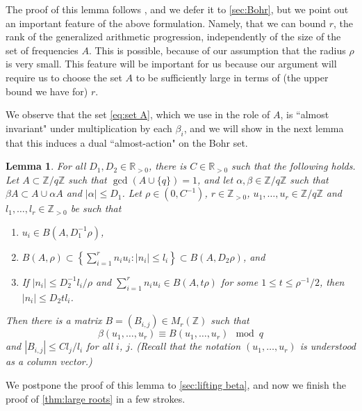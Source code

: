 \documentclass[12pt, a4paper]{amsart}
\numberwithin{equation}{section}
\newtheorem{lemma}[theorem]{Lemma}
\theoremstyle{definition}
\newcommand{\R}{\mathbb{R}}
\newcommand{\Z}{\mathbb{Z}}
\begin{document}
The proof of this lemma follows \cite{tao2006additive},
and we defer it to \cref{sec:Bohr},
but we point out an important feature of the above formulation.
Namely, that we can bound $r$, the rank of the generalized arithmetic progression,
independently of the size of the set of frequencies $A$.
This is possible, because of our assumption that the radius $\rho$ is very small.
This feature will be important for us because our argument will require us to choose
the set $A$ to be sufficiently large in terms of (the upper bound we have for) $r$.

We observe that the set \eqref{eq:set A}, which we use in the role of $A$,
is ``almost invariant" under multiplication by each
$\beta_i$, and we will show in the next lemma that this induces a dual ``almost-action"
on the Bohr set.

\begin{lemma}\label{lem:lifting beta}
For all $D_1,D_2\in \R_{>0}$, there is $C\in \R_{>0}$ such that the following holds.
Let $A\subset\Z/q\Z$ such that $\gcd(A\cup\{q\})=1$, and let $\alpha,\beta\in\Z/q\Z$
such that $\beta A\subset A\cup \alpha A$ and $|\alpha|\le D_1$.
Let $\rho\in(0,C^{-1})$, $r\in\Z_{>0}$, $u_1,\ldots,u_r\in\Z/q\Z$
and $l_1,\ldots, l_r\in\Z_{>0}$ be such that
\begin{enumerate}
\item $u_{i}\in B(A,D_1^{-1}\rho)$,
\item $B(A,\rho)\subset\left\{ \sum_{i=1}^{r}n_{i}u_{i}:|n_{i}|\le l_{i}\right\} \subset B(A,D_2\rho)$, and
\item If $\left|n_{i}\right|\le D_2^{-1}l_{i}/\rho$ and $\sum_{i=1}^{r}n_{i}u_{i}\in B(A,t\rho)$
for some $1\le t\le{\rho}^{-1}/2$, then $\left|n_{i}\right|\le D_2tl_{i}$.
\end{enumerate}

Then there is a matrix $B=(B_{i,j})\in M_r(\Z)$ such that
\[
\beta (u_1,\ldots, u_r)\equiv B(u_1,\ldots,u_r) \mod q
\]
and $|B_{i,j}|\le C l_j/l_i$ for all $i$, $j$.
(Recall that the notation $(u_1,\ldots,u_r)$ is understood as a column vector.)
\end{lemma} 

We postpone the proof of this lemma to \cref{sec:lifting beta},
and now we finish the proof of \cref{thm:large roots} in a few strokes.
\end{document}
